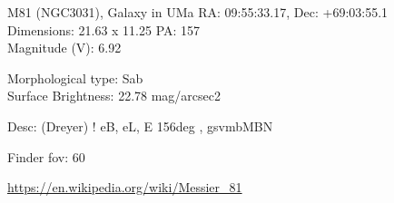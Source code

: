 \begin{block}{M81 (NGC3031), Galaxy in UMa}
    RA: 09:55:33.17, Dec: +69:03:55.1 \\ 
    Dimensions: 21.63 x 11.25 PA: 157 \\ 
    Magnitude (V): 6.92

    Morphological type: Sab \\ 
    Surface Brightness: 22.78 mag/arcsec2 

    Desc: (Dreyer) ! eB, eL, E 156deg , gsvmbMBN 

    Finder fov: 60 

    \url{https://en.wikipedia.org/wiki/Messier_81} 
\end{block}